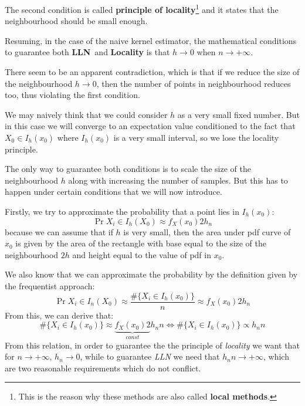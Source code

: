 The second condition is called \textbf{principle of locality}\footnote{This is the reason why these methods are also called \textbf{local methods}.} and it states that the neighbourhood should be small enough.

Resuming, in the case of the naive kernel estimator, the mathematical conditions to guarantee both \textbf{LLN} and \textbf{Locality} is that $h \to 0$ when $n \to +\infty$.

There seem to be an apparent contradiction, which is that if we reduce the size of the neighbourhood $h \to 0$, then the number of points in neighbourhood reduces too, thus violating the first condition.

We may naively think that we could consider $h$ as a very small fixed number. But in this case we will converge to an expectation value conditioned to the fact that $X_0\in I_h(x_0)$ where $I_h(x_0)$ is a very small interval, so we lose the locality principle.

The only way to guarantee both conditions is to scale the size of the neighbourhood $h$ along with increasing the number of samples. But this has to happen under certain conditions that we will now introduce.

Firstly, we try to approximate the probability that a point lies in $I_h(x_0)$:
\[
    \Pr{X_i \in I_h(X_0)} \approx f_X(x_0) 2 h_n
\]
because we can assume that if $h$ is very small, then the area under pdf curve of $x_0$ is given by the area of the rectangle with base equal to the size of the neighbourhood $2h$ and height equal to the value of pdf in $x_0$.
\begin{figure}
    \centering
\end{figure}
We also know that we can approximate the probability by the definition given by the frequentist approach:
\[
    \Pr{X_i \in I_n(X_0)} \approx \frac{\#\{X_i \in I_h(x_0)\}}{n} \approx f_X(x_0) 2 h_n
\]
From this, we can derive that:
\[
    \#\{X_i \in I_h(x_0)\} \approx \underbrace{f_X(x_0) 2}_{const} h_n n \iff \#\{X_i \in I_h(x_0)\} \propto h_n n
\]
From this relation, in order to guarantee the the principle of \textit{locality} we want that for $n \to +\infty$, $h_n \to 0$, while to guarantee \textit{LLN} we need that $h_n n \to +\infty$, which are two reasonable requirements which do not conflict. %


